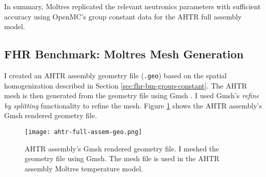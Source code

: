 In summary, Moltres replicated the relevant neutronics parameters with sufficient 
accuracy using OpenMC's group constant data for the \gls{AHTR} full assembly 
model. 

\subsection{FHR Benchmark: Moltres Mesh Generation}
I created an \gls{AHTR} assembly geometry file (\texttt{.geo}) based on the spatial 
homogenization described in Section \ref{sec:fhr-bm-group-constant}.
The \gls{AHTR} mesh is then generated from the geometry file using Gmsh 
\cite{geuzaine_gmsh_2009}.
I used Gmsh's \textit{refine by splitting} functionality to refine the mesh.
Figure \ref{fig:ahtr-full-assem-geo} shows the \gls{AHTR} assembly's Gmsh rendered 
geometry file.
\begin{figure}[htbp]
    \centering
    \texttt{[image: ahtr-full-assem-geo.png]}
    \caption{\acrfull{AHTR} assembly's Gmsh rendered geometry file. 
    I meshed the geometry file using Gmsh.
    The mesh file is used in the \gls{AHTR} assembly Moltres temperature model.}
    \label{fig:ahtr-full-assem-geo}
\end{figure}

\pagebreak
